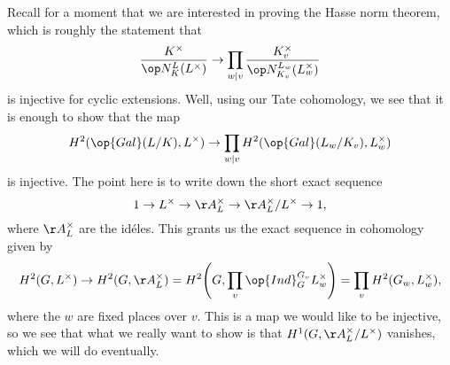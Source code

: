 \documentclass[../notes.tex]{subfiles}
\begin{document}
Recall for a moment that we are interested in proving the Hasse norm theorem, which is roughly the statement that
\[\frac{K^\times}{\op N^L_K(L^\times)}\to\prod_{w\mid v}\frac{K_v^\times}{\op N_{K_v}^{L_w}(L_w^\times)}\]
is injective for cyclic extensions. Well, using our Tate cohomology, we see that it is enough to show that the map
\[H^2(\op{Gal}(L/K),L^\times)\to\prod_{w\mid v}H^2(\op{Gal}(L_w/K_v),L_w^\times)\]
is injective. The point here is to write down the short exact sequence
\[1\to L^\times\to\AA_L^\times\to\AA_L^\times/L^\times\to1,\]
where $\AA_L^\times$ are the id\'eles. This grants us the exact sequence in cohomology given by
\[H^2(G,L^\times)\to H^2(G,\AA_L^\times)=H^2\Bigg(G,\prod_v\op{Ind}_G^{G_v}L_w^\times\Bigg)=\prod_vH^2(G_w,L_w^\times),\]
where the $w$ are fixed places over $v$. This is a map we would like to be injective, so we see that what we really want to show is that $H^1(G,\AA_L^\times/L^\times)$ vanishes, which we will do eventually.
\end{document}
